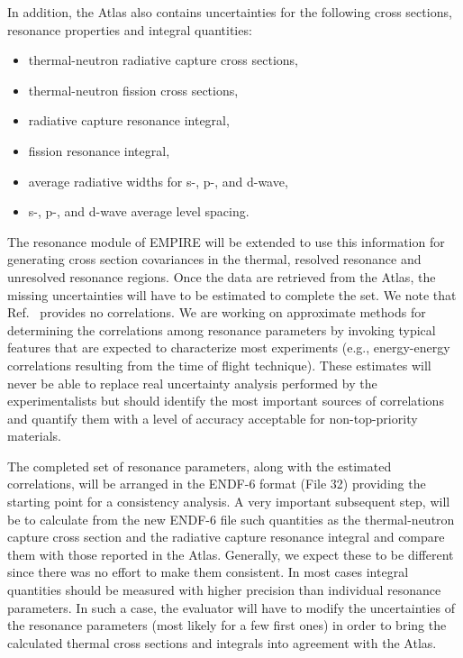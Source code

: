 In addition, the Atlas also contains uncertainties for the following cross
sections, resonance properties and integral quantities:

\begin{itemize}
\item thermal-neutron radiative capture cross sections,

\item thermal-neutron fission cross sections,

\item radiative capture resonance integral,

\item fission resonance integral,

\item average radiative widths for s-, p-, and d-wave,

\item s-, p-, and d-wave average level spacing.
\end{itemize}

The resonance module of EMPIRE will be extended to use this information for
generating cross section covariances in the thermal, resolved resonance and
unresolved resonance regions. Once the data are retrieved from the Atlas,
the missing uncertainties will have to be estimated to complete the set.
We note that Ref.~\cite{Mughabghab:06} provides no correlations.
We are working on approximate methods for determining the correlations among
resonance parameters by invoking typical features that are expected to
characterize most experiments (e.g., energy-energy correlations resulting
from the time of flight technique). These estimates will never be able to
replace real uncertainty analysis performed by the experimentalists but
should identify the most important sources of correlations and quantify them
with a level of accuracy acceptable for non-top-priority materials.

The completed set of resonance parameters, along with the estimated
correlations, will be arranged in the ENDF-6 format (File 32) providing the
starting point for a consistency analysis. A very important subsequent
step, will be to calculate from the new ENDF-6 file such quantities as
the thermal-neutron capture cross section and the radiative capture resonance
integral and compare them with those reported in the Atlas. Generally, we
expect these to be different since there was no effort to make them
consistent. In most cases integral quantities should be measured with higher
precision than individual resonance parameters. In such a case, the
evaluator will have to modify the uncertainties of the resonance parameters
(most likely for a few first ones) in order to bring the calculated thermal
cross sections and integrals into agreement with the Atlas.

